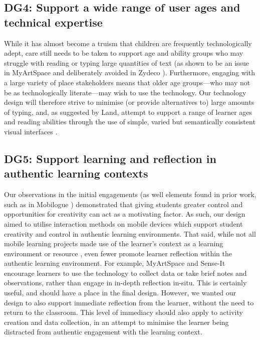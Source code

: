 \subsection*{ DG4: Support a wide range of user ages and technical expertise }
\label{DG4}

While it has almost become a truism that children are frequently technologically adept, care still needs to be taken to support age and ability groups who may struggle with reading or typing large quantities of text (as shown to be an issue in MyArtSpace \citep{Vavoula2009} and deliberately avoided in Zydeco \citep{kuhn2011}). Furthermore, engaging with a large variety of place stakeholders means that older age groups---who may not be as technologically literate---may wish to use the technology. Our technology design will therefore strive to minimise (or provide alternatives to) large amounts of typing, and, as suggested by Land, attempt to support a range of learner ages and reading abilities through the use of simple, varied but semantically consistent visual interfaces \citep{Land2015}.

\subsection*{ DG5: Support learning and reflection in authentic learning contexts }
\label{DG5}

Our observations in the initial engagements (as well elements found in prior work, such as in Mobilogue \citep{Giemza2013}) demonstrated that giving students greater control and opportunities for creativity can act as a motivating factor. As such, our design aimed to utilise interaction methods on mobile devices which support student creativity and control in authentic learning environments. That said, while not all mobile learning projects made use of the learner's context as a learning environment or resource \citep{Frohberg2009}, even fewer promote learner reflection within the authentic learning environment. For example, MyArtSpace \citep{Vavoula2009} and Sense-It \citep{Sharples2017} encourage learners to use the technology to collect data or take brief notes and observations, rather than engage in in-depth reflection in-situ. This is certainly useful, and should have a place in the final design. However, we wanted our design to also support immediate reflection from the learner, without the need to return to the classroom. This level of immediacy should also apply to activity creation and data collection, in an attempt to minimise the learner being distracted from authentic engagement with the learning context. 

